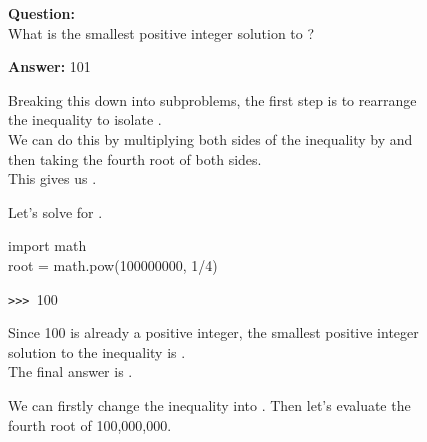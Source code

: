\documentclass{article} \usepackage{iclr2023_conference,times}
\begin{document}
\setlength{\columnsep}{1cm}
\begin{figure}[t]
\setlength{\columnsep}{3mm}
\begin{multicols}{2}
\begin{tcolorbox}[colback=blue!12!white,colframe=blue!75!black,title=Question]
\vspace{-1mm}
\begin{small}
\textbf{Question:}\\
What is the smallest positive integer solution to ?

\textbf{Answer:}
101
\end{small}
\end{tcolorbox}
\vspace{-1.5mm}
\begin{tcolorbox}[colback=red!5!white,colframe=red!75!black,title=\large(a)\normalsize~Example: w/o self verification]
\vspace{-1mm}
\begin{tiny}
Breaking this down into subproblems, the first step is to rearrange the inequality to isolate .\\
We can do this by multiplying both sides of the inequality by  and then taking the fourth root of both sides.\\
This gives us .

Let's solve for .
\begin{tcolorbox}[colback=black!5!white,colframe=black!75!black,title=code]
\vspace{-2mm}

\begin{tiny}
import math\\
root = math.pow(100000000, 1/4)
\end{tiny}

\texttt{>>> }100
\vspace{-2mm}
\end{tcolorbox}
\vspace{-2mm}

Since 100 is already a positive integer, the smallest positive integer solution to the inequality  is .\\
The final answer is . \LARGE \textcolor{red}{\xmark}

\end{tiny}
\end{tcolorbox}


\begin{tcolorbox}[colback=green!5!white,colframe=green!75!black,title=\large(b)\normalsize~Example: w/ self verifications]
\vspace{-1mm}
\begin{tiny}
We can firstly change the inequality into . Then let's evaluate the fourth root of 100,000,000.


\end{tiny}
\end{tcolorbox}
\end{multicols}
\end{figure}
\end{document}

